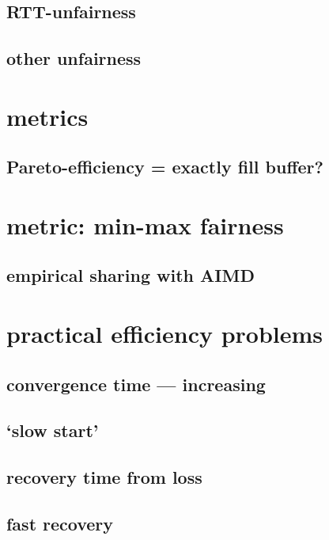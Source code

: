 \subsection{RTT-unfairness}


\subsection{other unfairness}


\section{metrics}

\begin{../congest/metrics}

\subsection{Pareto-efficiency = exactly fill buffer?}

\section{metric: min-max fairness}

\subsection{empirical sharing with AIMD}

\section{practical efficiency problems}

\subsection{convergence time --- increasing}

\subsection{`slow start'}

\subsection{recovery time from loss}

\subsection{fast recovery}


\end{../congest/metrics}
